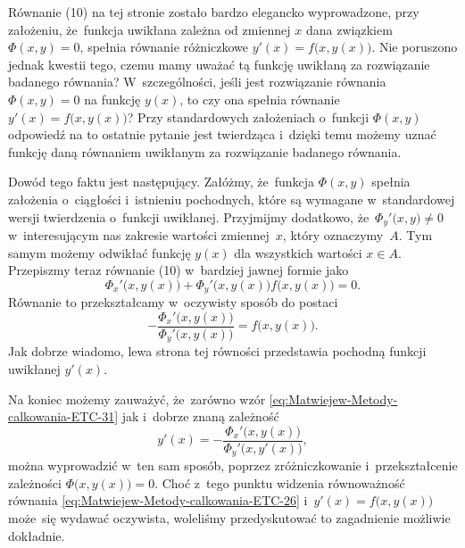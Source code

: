 \documentclass[a4paper,11pt]{article}
\numberwithin{equation}{section}
\begin{document}
\noindent
{} Równanie (10) na tej stronie zostało bardzo elegancko wyprowadzone,
przy założeniu, że~funkcja uwikłana zależna od zmiennej $x$ dana związkiem
$\Phi( x, y ) = 0$, spełnia równanie różniczkowe
$y'( x ) = f\big( x, y( x ) \big)$. Nie poruszono jednak kwestii tego, czemu
mamy uważać tą funkcję uwikłaną za rozwiązanie badanego równania?
W~szczególności, jeśli jest rozwiązanie równania $\Phi( x, y ) = 0$ na funkcję
$y( x )$, to czy ona spełnia równanie $y'( x ) = f\big( x, y( x ) \big)$?
Przy standardowych założeniach o~funkcji $\Phi( x, y )$ odpowiedź na to
ostatnie pytanie jest twierdząca i~dzięki temu możemy uznać funkcję daną
równaniem uwikłanym za rozwiązanie badanego równania.

Dowód tego faktu jest następujący. Załóżmy, że~funkcja $\Phi( x, y )$ spełnia
założenia o~ciągłości i~istnieniu pochodnych, które są wymagane
w~standardowej wersji twierdzenia o~funkcji uwikłanej. Przyjmijmy dodatkowo,
że~$\Phi_{ y }'\big( x, y \big) \neq 0$ w~interesującym nas zakresie wartości
zmiennej~$x$, który oznaczymy~$A$. Tym samym możemy odwikłać funkcję
$y( x )$ dla wszystkich wartości $x \in A$. Przepiszmy teraz równanie (10)
w~bardziej jawnej formie jako
\begin{equation}
  \label{eq:Matwiejew-Metody-calkowania-ETC-31}
  \Phi_{ x }'\big( x, y( x ) \big) +
  \Phi_{ y }'\big( x, y( x ) \big) f\big( x, y( x ) \big) = 0.
\end{equation}
Równanie to przekształcamy w~oczywisty sposób do postaci
\begin{equation}
  \label{eq:Matwiejew-Metody-calkowania-ETC-32}
  -\frac{ \Phi_{ x }'\big( x, y( x ) \big) }
  { \Phi_{ y }'\big( x, y( x ) \big) } =
  f\big( x, y( x ) \big).
\end{equation}
Jak dobrze wiadomo, lewa strona tej równości przedstawia pochodną funkcji
uwikłanej $y'( x )$.

Na koniec możemy zauważyć, że~zarówno wzór
\eqref{eq:Matwiejew-Metody-calkowania-ETC-31} jak i~dobrze znaną zależność
\begin{equation}
  \label{eq:Matwiejew-Metody-calkowania-ETC-33}
  y'( x ) =
  -\frac{ \Phi_{ x }'\big( x, y( x ) \big) }{ \Phi_{ y }'\big( x, y'( x ) \big) },
\end{equation}
można wyprowadzić w~ten sam sposób, poprzez zróżniczkowanie
i~przekształcenie zależności $\Phi\big( x, y( x ) \big) = 0$. Choć z~tego
punktu widzenia równoważność równania
\eqref{eq:Matwiejew-Metody-calkowania-ETC-26}
i~$y'( x ) = f\big( x, y( x ) \big)$ może~się wydawać oczywista, woleliśmy
przedyskutować to zagadnienie możliwie dokładnie.
\end{document}
